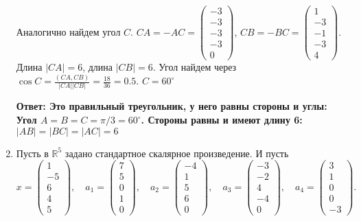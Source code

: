 \documentclass[a4paper,12pt]{article}
\begin{document}
\begin{enumerate}
Аналогично найдем угол $C$.
$CA=-AC = \begin{pmatrix}
-3\\-3\\-3\\-3\\0
\end{pmatrix}$, $CB=-BC = \begin{pmatrix}
1\\-3\\-1\\-3\\4
\end{pmatrix}$. Длина $|CA|  =6$, длина $|CB|=6$. Угол найдем через $\cos{C}= \frac{(CA,CB)}{|CA| |CB|}=\frac{18}{36}=0.5$. $C=60^{\circ}$

\textbf{Ответ: Это правильный  треугольник, у него равны стороны и углы: Угол $A=B=C = \pi/3=60^{\circ}$. Стороны равны и имеют длину 6: $|AB|=|BC|=|AC|=6$}

\item Пусть в $\mathbb R^5$ задано стандартное скалярное произведение. И пусть 
\[
x =
\begin{pmatrix}
{1}\\{-5}\\{6}\\{4}\\{5}
\end{pmatrix}
,\quad
a_1 = 
\begin{pmatrix}
{7}\\{5}\\{0}\\{1}\\{0}
\end{pmatrix}
,\quad
a_2 = 
\begin{pmatrix}
{-4}\\{1}\\{5}\\{6}\\{0}
\end{pmatrix}
,\quad
a_3 = 
\begin{pmatrix}
{-3}\\{-2}\\{4}\\{-4}\\{0}
\end{pmatrix}, \quad
a_4 = 
\begin{pmatrix}
{3}\\{1}\\{0}\\{0}\\{-3}
\end{pmatrix}.
\]


\end{enumerate}
\end{document}
